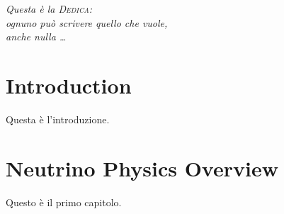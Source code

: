 \documentclass[12pt,a4paper,openright,twoside]{report}
\begin{document}
\begin{titlepage}                      
\thispagestyle{empty}                  
\topmargin=6.5cm                        
\raggedleft                            
\large                                  
\em                                    
Questa \`e la \textsc{Dedica}:\\
ognuno pu\`o scrivere quello che vuole, \\
anche nulla \ldots                      
\newpage                               
\clearpage{\pagestyle{empty}\cleardoublepage}
\end{titlepage}




\tableofcontents                       
\rhead[\fancyplain{}{\bfseries\leftmark}]{\fancyplain{}{\bfseries\thepage}}

\clearpage{\pagestyle{empty}\cleardoublepage}


\chapter*{Introduction}                 
Questa \`e l'introduzione.
\clearpage{\pagestyle{empty}\cleardoublepage}

\chapter{Neutrino Physics Overview}                
Questo \`e il primo capitolo.
\end{document}
